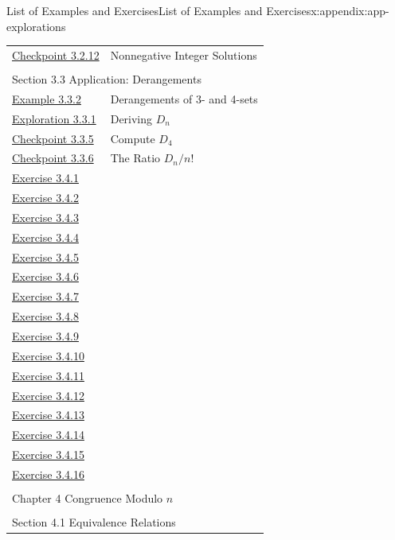 \documentclass[oneside,10pt,]{book}
\numberwithin{equation}{section}
\begin{document}
\begin{appendixptx}{List of Examples and Exercises}{}{List of Examples and Exercises}{}{}{x:appendix:app-explorations}
\begin{longtable}[l]{ll}
\hyperref[x:exercise:ex-pie-nonnegative]{Checkpoint 3.2.12}& Nonnegative Integer Solutions\\
\multicolumn{2}{l}{\null}\\[1.5ex] \multicolumn{2}{l}{\large Section 3.3 Application: Derangements}\\[0.5ex]
\hyperref[x:example:eg-derangement-34]{Example 3.3.2}& Derangements of 3- and 4-sets\\
\hyperref[x:exploration:expl-derangement-Dn]{Exploration 3.3.1}& Deriving \(D_n\)\\
\hyperref[x:exercise:ex-derangement-D4]{Checkpoint 3.3.5}& Compute \(D_4\)\\
\hyperref[x:exercise:ex-derangement-ratio]{Checkpoint 3.3.6}& The Ratio \(D_n/n!\)\\
\hyperlink{g:exercise:id480265}{Exercise 3.4.1}& \\
\hyperlink{g:exercise:id480368}{Exercise 3.4.2}& \\
\hyperlink{g:exercise:id480406}{Exercise 3.4.3}& \\
\hyperlink{g:exercise:id480452}{Exercise 3.4.4}& \\
\hyperlink{g:exercise:id480485}{Exercise 3.4.5}& \\
\hyperlink{g:exercise:id480533}{Exercise 3.4.6}& \\
\hyperlink{g:exercise:id480685}{Exercise 3.4.7}& \\
\hyperlink{g:exercise:id480759}{Exercise 3.4.8}& \\
\hyperlink{g:exercise:id480825}{Exercise 3.4.9}& \\
\hyperlink{g:exercise:id480931}{Exercise 3.4.10}& \\
\hyperlink{g:exercise:id480971}{Exercise 3.4.11}& \\
\hyperlink{g:exercise:id480993}{Exercise 3.4.12}& \\
\hyperlink{g:exercise:id481024}{Exercise 3.4.13}& \\
\hyperlink{g:exercise:id481064}{Exercise 3.4.14}& \\
\hyperlink{g:exercise:id481237}{Exercise 3.4.15}& \\
\hyperlink{g:exercise:id481354}{Exercise 3.4.16}& \\
\multicolumn{2}{l}{\null}\\[1.5ex] \multicolumn{2}{l}{\large Chapter 4 Congruence Modulo \(n\)}\\[0.5ex]
\multicolumn{2}{l}{\null}\\[1.5ex] \multicolumn{2}{l}{\large Section 4.1 Equivalence Relations}\\[0.5ex]

\end{longtable}
\end{appendixptx}
\end{document}
